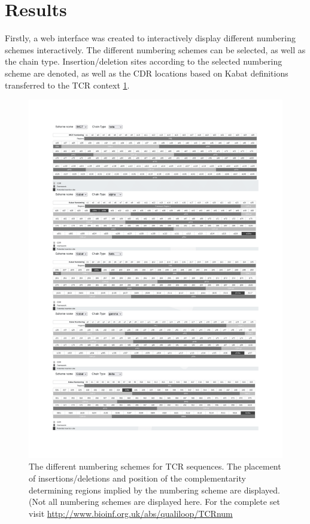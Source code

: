 \section{Results}

Firstly, a web interface was created to interactively display different numbering schemes interactively. The different numbering schemes can be selected, as well as the chain type. Insertion/deletion sites according to the selected numbering scheme are denoted, as well as the CDR locations based on Kabat definitions transferred to the TCR context \ref{fig:schemes}. 
\begin{figure}
    \centering
    \includegraphics[width=\textwidth,height=\textheight,keepaspectratio]{schemes-1.png}
    \caption{The different numbering schemes for TCR sequences. The placement of insertions/deletions and position of the complementarity determining regions implied by the numbering scheme are displayed. (Not all numbering schemes are displayed here. For the complete set visit \url{http://www.bioinf.org.uk/abs/qualiloop/TCRnum} }
    \label{fig:schemes}
\end{figure}


